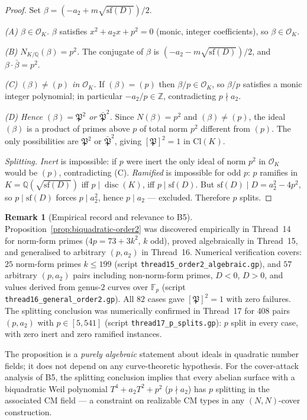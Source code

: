 \documentclass[11pt,a4paper]{article}
\theoremstyle{definition}
\newtheorem{remark}[theorem]{Remark}
\newcommand{\FF}{\mathbb{F}}
\newcommand{\ZZ}{\mathbb{Z}}
\newcommand{\QQ}{\mathbb{Q}}
\newcommand{\disc}{\operatorname{disc}}
\begin{document}
\begin{proof}
Set $\beta = (-a_2 + m\sqrt{\mathrm{sf}(D)})/2$.

\smallskip
\noindent\textit{(A) $\beta \in \mathcal{O}_K$.}
$\beta$ satisfies $x^2 + a_2 x + p^2 = 0$ (monic, integer coefficients), so
$\beta \in \mathcal{O}_K$.

\smallskip
\noindent\textit{(B) $N_{K/\QQ}(\beta) = p^2$.}
The conjugate of $\beta$ is $(-a_2 - m\sqrt{\mathrm{sf}(D)})/2$, and
$\beta \cdot \bar\beta = p^2$.

\smallskip
\noindent\textit{(C) $(\beta) \neq (p)$ in $\mathcal{O}_K$.}
If $(\beta) = (p)$ then $\beta/p \in \mathcal{O}_K$, so $\beta/p$ satisfies a monic
integer polynomial; in particular $-a_2/p \in \ZZ$, contradicting $p \nmid a_2$.

\smallskip
\noindent\textit{(D) Hence $(\beta) = \mathfrak{P}^2$ or $\bar{\mathfrak{P}}^2$.}
Since $N(\beta) = p^2$ and $(\beta) \neq (p)$, the ideal $(\beta)$ is a product of
primes above $p$ of total norm $p^2$ different from $(p)$.
The only possibilities are $\mathfrak{P}^2$ or $\bar{\mathfrak{P}}^2$, giving
$[\mathfrak{P}]^2 = 1$ in $\mathrm{Cl}(K)$.

\smallskip
\noindent\textit{Splitting.}
\emph{Inert} is impossible: if $p$ were inert the only ideal of norm $p^2$ in
$\mathcal{O}_K$ would be $(p)$, contradicting (C).
\emph{Ramified} is impossible for odd $p$: $p$ ramifies in $K = \QQ(\sqrt{\mathrm{sf}(D)})$
iff $p \mid \disc(K)$, iff $p \mid \mathrm{sf}(D)$.
But $\mathrm{sf}(D) \mid D = a_2^2 - 4p^2$, so $p \mid \mathrm{sf}(D)$ forces
$p \mid a_2^2$, hence $p \mid a_2$ --- excluded.
Therefore $p$ splits.
\end{proof}

\begin{remark}[Empirical record and relevance to B5]\label{rem:order2-empirical}
Proposition~\ref{prop:biquadratic-order2} was discovered empirically in Thread~14
for norm-form primes ($4p = 73 + 3k^2$, $k$ odd), proved algebraically in
Thread~15, and generalised to arbitrary $(p, a_2)$ in Thread~16.
Numerical verification covers:
$25$ norm-form primes $k \leq 199$ (script \texttt{thread15\_order2\_algebraic.gp}),
and $57$ arbitrary $(p, a_2)$ pairs including non-norm-form primes, $D < 0$, $D > 0$,
and values derived from genus-$2$ curves over $\FF_p$
(script \texttt{thread16\_general\_order2.gp}).
All $82$ cases gave $[\mathfrak{P}]^2 = 1$ with zero failures.
The splitting conclusion was numerically confirmed in Thread~17 for $408$ pairs
$(p, a_2)$ with $p \in [5, 541]$ (script \texttt{thread17\_p\_splits.gp}):
$p$ split in every case, with zero inert and zero ramified instances.

The proposition is a \emph{purely algebraic} statement about ideals in quadratic
number fields; it does not depend on any curve-theoretic hypothesis.
For the cover-attack analysis of B5, the splitting conclusion implies that
every abelian surface with a biquadratic Weil polynomial $T^4 + a_2 T^2 + p^2$
($p \nmid a_2$) has $p$ splitting in the associated CM field --- a constraint
on realizable CM types in any $(N,N)$-cover construction.
\end{remark}
\end{document}
